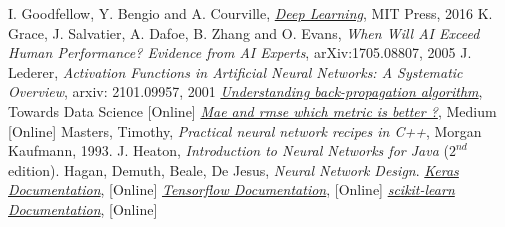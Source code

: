 \begin{thebibliography}{9}
 I. Goodfellow, Y. Bengio and A. Courville, \href{http://www.deeplearningbook.org}{\emph{Deep Learning}}, MIT Press, 2016
K. Grace, J. Salvatier, A. Dafoe, B. Zhang and O. Evans, \emph{When Will AI Exceed Human Performance? Evidence from AI Experts}, arXiv:1705.08807, 2005
 J. Lederer, \emph{Activation Functions in Artificial Neural Networks: A Systematic Overview}, arxiv: 2101.09957, 2001
\href{https://towardsdatascience.com/understanding-backpropagation-algorithm-7bb3aa2f95fd}{\emph{Understanding back-propagation algorithm}}, Towards Data Science [Online]
\href{https://medium.com/human-in-a-machine-world/mae-and-rmse-which-metric-is-better-e60ac3bde13d}{\emph{Mae and rmse which metric is better ?}}, Medium [Online]
 Masters, Timothy, \emph{Practical neural network recipes in C++}, Morgan Kaufmann, 1993.
 J. Heaton, \emph{Introduction to Neural Networks for Java} ($2^{nd}$ edition).
 Hagan, Demuth, Beale, De Jesus, \emph{Neural Network Design}.
\href{https://keras.io/}{\emph{Keras Documentation}}, [Online]  
\href{https://www.tensorflow.org/}{\emph{Tensorflow Documentation}}, [Online] 
\href{https://scikit-learn.org/stable/}{\emph{scikit-learn Documentation}}, [Online]
\end{thebibliography}
